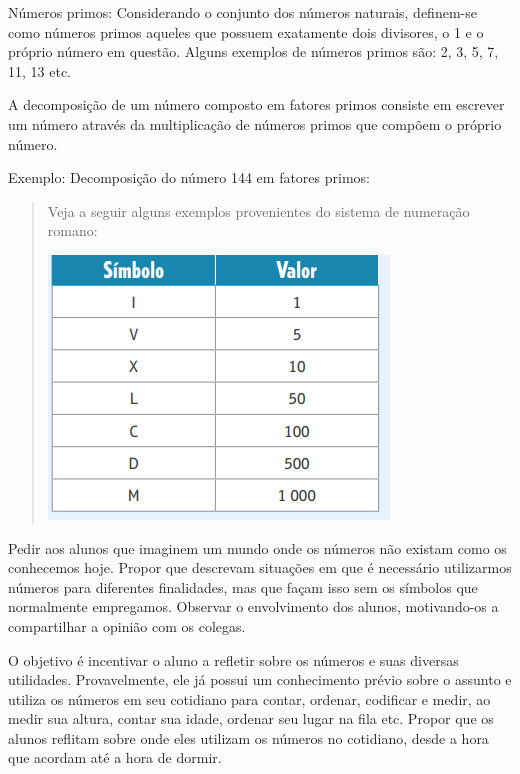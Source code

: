 Números primos: Considerando o conjunto dos números naturais, definem-se
como números primos aqueles que possuem exatamente dois divisores, o 1 e
o próprio número em questão. Alguns exemplos de números primos são: 2,
3, 5, 7, 11, 13 etc.

A decomposição de um número composto em fatores primos consiste em
escrever um número através da multiplicação de números primos que
compõem o próprio número.

Exemplo: Decomposição do número 144 em fatores primos: 


\begin{quote}
Veja a seguir alguns exemplos provenientes do sistema de numeração
romano:


\includegraphics[width=3.5625in,height=2.76042in]{./imgSAEB_6_MAT/media/image5.png}
\end{quote}

Pedir aos alunos que imaginem um mundo onde os números não existam como
os conhecemos hoje. Propor que descrevam situações em que é necessário
utilizarmos números para diferentes finalidades, mas que façam isso sem
os símbolos que normalmente empregamos. Observar o envolvimento dos
alunos, motivando-os a compartilhar a opinião com os colegas.

O objetivo é incentivar o aluno a refletir sobre os números e suas
diversas utilidades. Provavelmente, ele já possui um conhecimento prévio
sobre o assunto e utiliza os números em seu cotidiano para contar,
ordenar, codificar e medir, ao medir sua altura, contar sua idade,
ordenar seu lugar na fila etc. Propor que os alunos reflitam sobre onde
eles utilizam os números no cotidiano, desde a hora que acordam até a
hora de dormir.




